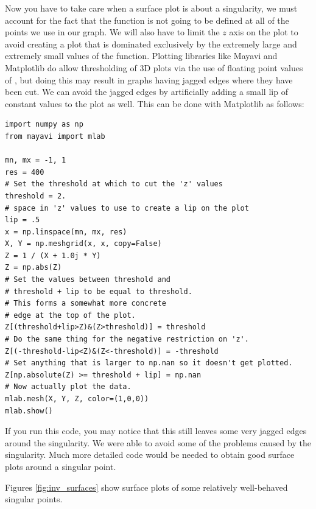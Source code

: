 Now you have to take care when a surface plot is about a singularity, we must account for the fact that the function is not going to be defined at all of the points we use in our graph.
We will also have to limit the $z$ axis on the plot to avoid creating a plot that is dominated exclusively by the extremely large and extremely small values of the function.
Plotting libraries like Mayavi and Matplotlib do allow thresholding of 3D plots via the use of floating point values of , but doing this may result in graphs having jagged edges where they have been cut.
We can avoid the jagged edges by artificially adding a small lip of constant values to the plot as well.
This can be done with Matplotlib as follows:
\begin{lstlisting}
import numpy as np
from mayavi import mlab

mn, mx = -1, 1
res = 400
# Set the threshold at which to cut the 'z' values
threshold = 2.
# space in 'z' values to use to create a lip on the plot
lip = .5
x = np.linspace(mn, mx, res)
X, Y = np.meshgrid(x, x, copy=False)
Z = 1 / (X + 1.0j * Y)
Z = np.abs(Z)
# Set the values between threshold and
# threshold + lip to be equal to threshold.
# This forms a somewhat more concrete
# edge at the top of the plot.
Z[(threshold+lip>Z)&(Z>threshold)] = threshold
# Do the same thing for the negative restriction on 'z'.
Z[(-threshold-lip<Z)&(Z<-threshold)] = -threshold
# Set anything that is larger to np.nan so it doesn't get plotted.
Z[np.absolute(Z) >= threshold + lip] = np.nan
# Now actually plot the data.
mlab.mesh(X, Y, Z, color=(1,0,0))
mlab.show()
\end{lstlisting}
If you run this code, you may notice that this still leaves some very jagged edges around the singularity.
We were able to avoid some of the problems caused by the singularity.
Much more detailed code would be needed to obtain good surface plots around a singular point.

Figures \ref{fig:inv_surfaces} show surface plots of some relatively well-behaved singular points.

